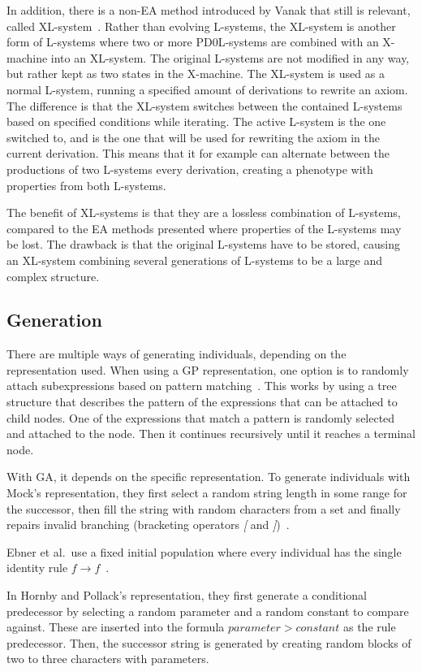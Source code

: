 In addition, there is a non-EA method introduced by Vanak that still is relevant, called XL-system~\cite{2000Vanak}.
Rather than evolving L-systems, the XL-system is another form of L-systems where two or more PD0L-systems are combined with an X-machine into an XL-system.
The original L-systems are not modified in any way, but rather kept as two states in the X-machine.
The XL-system is used as a normal L-system, running a specified amount of derivations to rewrite an axiom.
The difference is that the XL-system switches between the contained L-systems based on specified conditions while iterating.
The active L-system is the one switched to, and is the one that will be used for rewriting the axiom in the current derivation.
This means that it for example can alternate between the productions of two L-systems every derivation, creating a phenotype with properties from both L-systems.

The benefit of XL-systems is that they are a lossless combination of L-systems, compared to the EA methods presented where properties of the L-systems may be lost.
The drawback is that the original L-systems have to be stored, causing an XL-system combining several generations of L-systems to be a large and complex structure.

\subsection{Generation}
There are multiple ways of generating individuals, depending on the representation used.
When using a GP representation, one option is to randomly attach subexpressions based on pattern matching~\cite{1994Jacob}.
This works by using a tree structure that describes the pattern of the expressions that can be attached to child nodes. One of the expressions that match a pattern is randomly selected and attached to the node. Then it continues recursively until it reaches a terminal node.

With GA, it depends on the specific representation.
To generate individuals with Mock's representation, they first select a random string length in some range for the successor, then fill the string with random characters from a set and finally repairs invalid branching (bracketing operators \textit{[} and \textit{]})~\cite{1998Mock}.

Ebner et al.\ use a fixed initial population where every individual has the single identity rule $f\rightarrow f$~\cite{2002Ebner}.

In Hornby and Pollack's representation, they first generate a conditional predecessor by selecting a random parameter and a random constant to compare against.
These are inserted into the formula $parameter > constant$ as the rule predecessor.
Then, the successor string is generated by creating random blocks of two to three characters with parameters.~\cite{2001Hornby}

